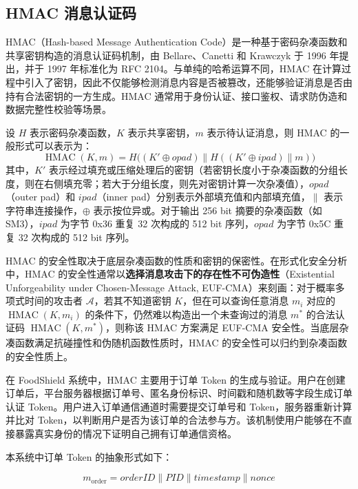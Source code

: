 \subsection{HMAC 消息认证码}

HMAC（Hash-based Message Authentication Code）是一种基于密码杂凑函数和共享密钥构造的消息认证码机制，由 Bellare、Canetti 和 Krawczyk 于 1996 年提出，并于 1997 年标准化为 RFC 2104\cite{rfc2104}。与单纯的哈希运算不同，HMAC 在计算过程中引入了密钥，因此不仅能够检测消息内容是否被篡改，还能够验证消息是否由持有合法密钥的一方生成。HMAC 通常用于身份认证、接口鉴权、请求防伪造和数据完整性校验等场景。

设 $H$ 表示密码杂凑函数，$K$ 表示共享密钥，$m$ 表示待认证消息，则 HMAC 的一般形式可以表示为：
\begin{equation}
\operatorname{HMAC}(K,m)=H\bigl((K' \oplus \mathit{opad})\parallel H((K' \oplus \mathit{ipad})\parallel m)\bigr)
\end{equation}
其中，$K'$ 表示经过填充或压缩处理后的密钥（若密钥长度小于杂凑函数的分组长度，则在右侧填充零；若大于分组长度，则先对密钥计算一次杂凑值），$\mathit{opad}$（outer pad）和 $\mathit{ipad}$（inner pad）分别表示外部填充值和内部填充值，$\parallel$ 表示字符串连接操作，$\oplus$ 表示按位异或。对于输出 256 bit 摘要的杂凑函数（如 SM3），$\mathit{ipad}$ 为字节 0x36 重复 32 次构成的 512 bit 序列，$\mathit{opad}$ 为字节 0x5C 重复 32 次构成的 512 bit 序列。

HMAC 的安全性取决于底层杂凑函数的性质和密钥的保密性。在形式化安全分析中，HMAC 的安全性通常以\textbf{选择消息攻击下的存在性不可伪造性}（Existential Unforgeability under Chosen-Message Attack, EUF-CMA）来刻画：对于概率多项式时间的攻击者 $\mathcal{A}$，若其不知道密钥 $K$，但在可以查询任意消息 $m_i$ 对应的 $\operatorname{HMAC}(K, m_i)$ 的条件下，仍然难以构造出一个未查询过的消息 $m^*$ 的合法认证码 $\operatorname{HMAC}(K, m^*)$，则称该 HMAC 方案满足 EUF-CMA 安全性。当底层杂凑函数满足抗碰撞性和伪随机函数性质时，HMAC 的安全性可以归约到杂凑函数的安全性质上。



在 FoodShield 系统中，HMAC 主要用于订单 Token 的生成与验证。用户在创建订单后，平台服务器根据订单号、匿名身份标识、时间戳和随机数等字段生成订单认证 Token。用户进入订单通信通道时需要提交订单号和 Token，服务器重新计算并比对 Token，以判断用户是否为该订单的合法参与方。该机制使用户能够在不直接暴露真实身份的情况下证明自己拥有订单通信资格。

本系统中订单 Token 的抽象形式如下：

\begin{equation}
m_{\mathrm{order}} = \mathit{orderID} \parallel \mathit{PID} \parallel \mathit{timestamp} \parallel \mathit{nonce}
\end{equation}

